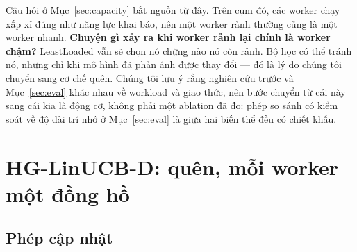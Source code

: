\documentclass[final,5p,times,twocolumn]{elsarticle}
\begin{document}
Câu hỏi ở Mục~\ref{sec:capacity} bắt nguồn từ đây. Trên cụm đó, các worker chạy xấp xỉ đúng như năng lực khai báo, nên một worker rảnh thường cũng là một worker nhanh. \textbf{Chuyện gì xảy ra khi worker rảnh lại chính là worker chậm?} LeastLoaded vẫn sẽ chọn nó chừng nào nó còn rảnh. Bộ học có thể tránh nó, nhưng chỉ khi mô hình đã phản ánh được thay đổi --- đó là lý do chúng tôi chuyển sang cơ chế quên. Chúng tôi lưu ý rằng nghiên cứu trước và Mục~\ref{sec:eval} khác nhau về workload và giao thức, nên bước chuyển từ cái này sang cái kia là động cơ, không phải một ablation đã đo: phép so sánh có kiểm soát về độ dài trí nhớ ở Mục~\ref{sec:eval} là giữa hai biến thể đều có chiết khấu.

\section{HG-LinUCB-D: quên, mỗi worker một đồng hồ}
\label{sec:hgd}

\subsection{Phép cập nhật}
\end{document}
